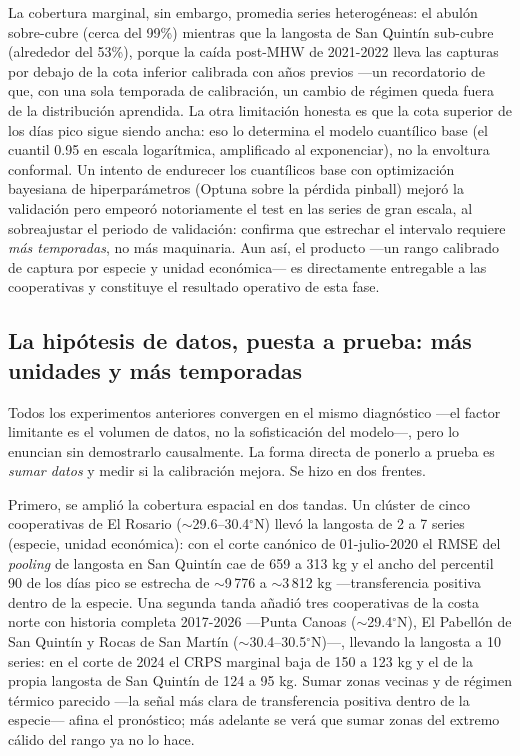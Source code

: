 La cobertura marginal, sin embargo, promedia series heterogéneas: el abulón sobre-cubre (cerca del 99\%) mientras que la langosta de San Quintín sub-cubre (alrededor del 53\%), porque la caída post-MHW de 2021-2022 lleva las capturas por debajo de la cota inferior calibrada con años previos ---un recordatorio de que, con una sola temporada de calibración, un cambio de régimen queda fuera de la distribución aprendida. La otra limitación honesta es que la cota superior de los días pico sigue siendo ancha: eso lo determina el modelo cuantílico base (el cuantil 0.95 en escala logarítmica, amplificado al exponenciar), no la envoltura conformal. Un intento de endurecer los cuantílicos base con optimización bayesiana de hiperparámetros (Optuna sobre la pérdida pinball) mejoró la validación pero empeoró notoriamente el test en las series de gran escala, al sobreajustar el periodo de validación: confirma que estrechar el intervalo requiere \emph{más temporadas}, no más maquinaria. Aun así, el producto ---un rango calibrado de captura por especie y unidad económica--- es directamente entregable a las cooperativas y constituye el resultado operativo de esta fase.

\subsection{La hipótesis de datos, puesta a prueba: más unidades y más temporadas}
\label{sec:extension_moredata}
Todos los experimentos anteriores convergen en el mismo diagnóstico ---el factor limitante es el volumen de datos, no la sofisticación del modelo---, pero lo enuncian sin demostrarlo causalmente. La forma directa de ponerlo a prueba es \emph{sumar datos} y medir si la calibración mejora. Se hizo en dos frentes.

Primero, se amplió la cobertura espacial en dos tandas. Un clúster de cinco cooperativas de El Rosario ($\sim$29.6--30.4$^\circ$N) llevó la langosta de 2 a 7 series (especie, unidad económica): con el corte canónico de 01-julio-2020 el RMSE del \emph{pooling} de langosta en San Quintín cae de 659 a 313 kg y el ancho del percentil 90 de los días pico se estrecha de $\sim$9\,776 a $\sim$3\,812 kg ---transferencia positiva dentro de la especie. Una segunda tanda añadió tres cooperativas de la costa norte con historia completa 2017-2026 ---Punta Canoas ($\sim$29.4$^\circ$N), El Pabellón de San Quintín y Rocas de San Martín ($\sim$30.4--30.5$^\circ$N)---, llevando la langosta a 10 series: en el corte de 2024 el CRPS marginal baja de 150 a 123 kg y el de la propia langosta de San Quintín de 124 a 95 kg. Sumar zonas vecinas y de régimen térmico parecido ---la señal más clara de transferencia positiva dentro de la especie--- afina el pronóstico; más adelante se verá que sumar zonas del extremo cálido del rango ya no lo hace.

